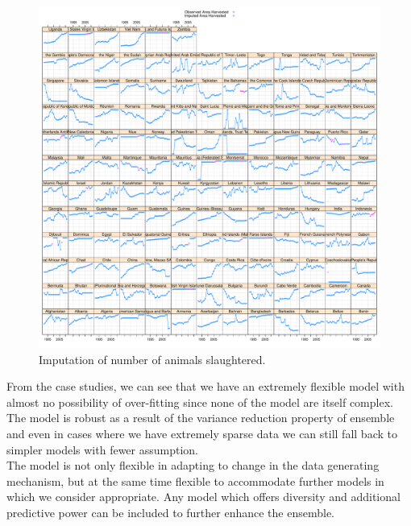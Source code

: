 \documentclass[nojss]{jss}\usepackage[]{graphicx}\usepackage[]{color}
\makeatletter
\def\maxwidth{ %
  \ifdim\Gin@nat@width>\linewidth
    \linewidth
  \else
    \Gin@nat@width
  \fi
}
\newenvironment{knitrout}{}{} %
\makeatother
\begin{document}
\begin{knitrout}
\color{fgcolor}\begin{figure}[!ht]


{\centering \includegraphics[width=\maxwidth]{figure/beef-areaharvested-imputed} 

}

\caption[Imputation of number of animals slaughtered]{Imputation of number of animals slaughtered.\label{fig:beef-areaharvested-imputed}}
\end{figure}


\end{knitrout}








\FloatBarrier

From the case studies, we can see that we have an extremely flexible
model with almost no possibility of over-fitting since none of the
model are itself complex. The model is robust as a result of the
variance reduction property of ensemble and even in cases where we
have extremely sparse data we can still fall back to simpler models
with fewer assumption.\\


The model is not only flexible in adapting to change in the data
generating mechanism, but at the same time flexible to accommodate
further models in which we consider appropriate. Any model which
offers diversity and additional predictive power can be included to
further enhance the ensemble.\\
\end{document}
